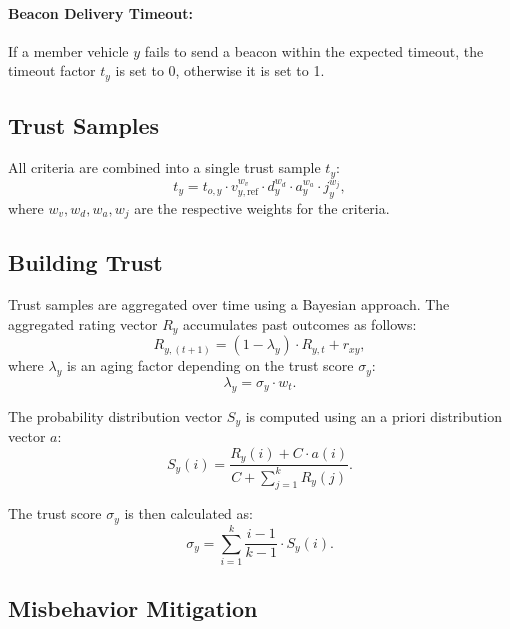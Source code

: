 \documentclass[letterpaper, 10pt, conference]{ieeeconf}  %
\begin{document}
\paragraph{Beacon Delivery Timeout:} If a member vehicle $y$ fails to send a beacon within the expected timeout, the timeout factor $t_y$ is set to 0, otherwise it is set to 1.

\subsection{Trust Samples}

All criteria are combined into a single trust sample $t_y$:
\begin{equation}
    t_y = t_{o,y} \cdot v^{w_v}_{y,\text{ref}} \cdot d^{w_d}_y \cdot a^{w_a}_y \cdot j^{w_j}_y,
\end{equation}
where $w_v, w_d, w_a, w_j$ are the respective weights for the criteria.

\subsection{Building Trust}

Trust samples are aggregated over time using a Bayesian approach. The aggregated rating vector $R_y$ accumulates past outcomes as follows:
\begin{equation}
    R_{y,(t+1)} = (1 - \lambda_y) \cdot R_{y,t} + r_{xy},
\end{equation}
where $\lambda_y$ is an aging factor depending on the trust score $\sigma_y$:
\begin{equation}
    \lambda_y = \sigma_y \cdot w_t.
\end{equation}

The probability distribution vector $S_y$ is computed using an a priori distribution vector $a$:
\begin{equation}
    S_y(i) = \frac{R_y(i) + C \cdot a(i)}{C + \sum_{j=1}^k R_y(j)}.
\end{equation}

The trust score $\sigma_y$ is then calculated as:
\begin{equation}
    \sigma_y = \sum_{i=1}^k \frac{i-1}{k-1} \cdot S_y(i).
\end{equation}

\subsection{Misbehavior Mitigation}
\end{document}
